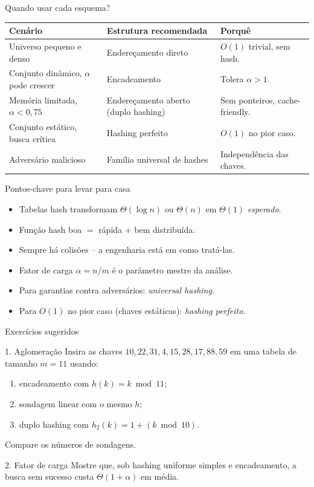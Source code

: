 \documentclass[aspectratio=169]{beamer}
\begin{document}
\begin{frame}{Quando usar cada esquema?}
\centering
\begin{tabular}{p{4cm}p{4.5cm}p{4cm}}
\toprule
\textbf{Cenário} & \textbf{Estrutura recomendada} & \textbf{Porquê} \\
\midrule
Universo pequeno e denso & Endereçamento direto & $O(1)$ trivial, sem hash. \\
Conjunto dinâmico, $\alpha$ pode crescer & Encadeamento & Tolera $\alpha > 1$. \\
Memória limitada, $\alpha < 0{,}75$ & Endereçamento aberto (duplo hashing) & Sem ponteiros, cache-friendly. \\
Conjunto estático, busca crítica & Hashing perfeito & $O(1)$ no pior caso. \\
Adversário malicioso & Família universal de hashes & Independência das chaves. \\
\bottomrule
\end{tabular}
\end{frame}

\begin{frame}{Pontos-chave para levar para casa}
\begin{itemize}
\item Tabelas hash transformam $\Theta(\log n)$ ou $\Theta(n)$ em $\Theta(1)$ \emph{esperado}.
\item Função hash boa $=$ rápida $+$ bem distribuída.
\item \alert{Sempre há colisões} -- a engenharia está em como tratá-las.
\item Fator de carga $\alpha = n/m$ é o parâmetro mestre da análise.
\item Para garantias contra adversários: \emph{universal hashing}.
\item Para $O(1)$ no pior caso (chaves estáticas): \emph{hashing perfeito}.
\end{itemize}
\end{frame}

\begin{frame}{Exercícios sugeridos}
\begin{block}{1. Aglomeração}
Insira as chaves $10, 22, 31, 4, 15, 28, 17, 88, 59$ em uma tabela de tamanho $m=11$ usando:
\begin{enumerate}
\item encadeamento com $h(k) = k \bmod 11$;
\item sondagem linear com o mesmo $h$;
\item duplo hashing com $h_2(k) = 1 + (k \bmod 10)$.
\end{enumerate}
Compare os números de sondagens.
\end{block}
\begin{block}{2. Fator de carga}
Mostre que, sob hashing uniforme simples e encadeamento, a busca sem sucesso custa $\Theta(1+\alpha)$ em média.
\end{block}
\end{frame}
\end{document}
